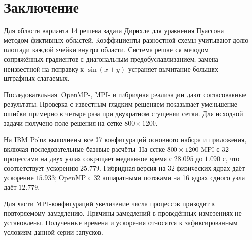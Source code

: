\clearpage
\section{Заключение}

Для области варианта 14 решена задача Дирихле для уравнения Пуассона методом фиктивных областей.
Коэффициенты разностной схемы учитывают долю площади каждой ячейки внутри области.
Система решается методом сопряжённых градиентов с диагональным предобуславливанием; замена неизвестной на поправку к $\sin(x+y)$ устраняет вычитание больших штрафных слагаемых.

Последовательная, OpenMP-, MPI- и гибридная реализации дают согласованные результаты.
Проверка с известным гладким решением показывает уменьшение ошибки примерно в четыре раза при двукратном сгущении сетки.
Для исходной задачи получено поле решения на сетке $800\times1200$.

На IBM Polus выполнены все 37 конфигураций основного набора и приложения, включая последовательные базовые расчёты.
На сетке $800\times1200$ MPI с 32 процессами на двух узлах сокращает медианное время с $28.095$ до $1.090$ с, что соответствует ускорению $25.779$.
Гибридная версия на 32 физических ядрах даёт ускорение $15.933$; OpenMP с 32 аппаратными потоками на 16 ядрах одного узла даёт $12.779$.

Для части MPI-конфигураций увеличение числа процессов приводит к повторяемому замедлению.
Причины замедлений в проведённых измерениях не установлены.
Полученные времена и ускорения относятся к зафиксированным условиям данной серии запусков.
